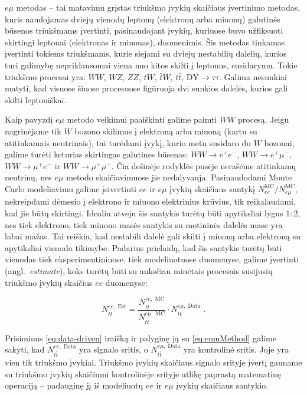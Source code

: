 \documentclass[a4paper, 12pt]{article}
\newcommand{\WW}{W\! W}
\newcommand{\ZZ}{Z\! Z}
\newcommand{\WZ}{W\! Z}
\newcommand{\tbarW}{\bar{t}W}
\newcommand{\ttbar}{t\bar{t}}
\newcommand{\emu}{e\mu}
\newcommand{\DYtau}{\mathrm{DY} \! \rightarrow \! \tau\tau}
\newlength\q
\begin{document}
$\emu$ metodas -- tai matavimu grįstas triukšmo įvykių skaičiaus įvertinimo metodas, kuris
naudojamas dviejų vienodų leptonų (elektronų arba miuonų) galutinės būsenos triukšmams
įvertinti, pasinaudojant įvykių, kuriuose buvo užfiksuoti skirtingi leptonai (elektronas
ir miuonas), duomenimis.
Šis metodas tinkamas įvertinti tokiems triukšmams, kurie siejami su dviejų nestabilių
dalelių, kurios turi galimybę nepriklausomai viena nuo kitos skilti į leptonus, susidarymu.
Tokie triukšmo procesai yra: $\WW$, $\WZ$, $\ZZ$, $tW$, $\tbarW$, $\ttbar$, $\DYtau$.
Galima nesunkiai matyti, kad visuose šiuose procesuose figūruoja dvi sunkios dalelės, kurios
gali skilti leptoniškai.

Kaip pavyzdį $\emu$ metodo veikimui paaiškinti galime paimti $WW$ procesą.
Jeigu nagrinėjame tik $W$ bozono skilimus į elektroną arba miuoną (kartu su atitinkamais
neutrinais), tai turėdami įvykį, kurio metu susidaro du $W$ bozonai, galime turėti
keturias skirtingas galutines būsenas: $WW \! \rightarrow \! e^+e^-$,
$WW \! \rightarrow \! e^+\mu^-$, $WW \! \rightarrow \! \mu^+e^-$ ir
$WW \! \rightarrow \! \mu^+\mu^-$.
Čia dešinėje rodyklės pusėje nerašėme atitinkamų neutrinų, nes $\emu$ metodo skaičiavimuose
jie nedalyvauja.
Pasinaudodami Monte Carlo modeliavimu galime įsivertinti $ee$ ir $\emu$ įvykių skaičiaus
santykį $N_{ee}^{\mathrm{MC}} / N_{\emu}^{\mathrm{MC}}$, nekreipdami dėmesio į elektrono
ir miuono elektrinius krūvius, tik reikalaudami, kad jie būtų skirtingi.
Idealiu atveju šis santykis turėtų būti apytiksliai lygus $1:2$, nes tiek elektrono, tiek
miuono masės santykis su motininės dalelės mase yra labai mažas.
Tai reiškia, kad nestabili dalelė gali skilti į miuoną arba elektroną su apytiksliai
vienoda tikimybe.
Padarius prielaidą, kad šis santykis turėtų būti vienodas tiek eksperimentiniuose, tiek
modeliuotuose duomenyse, galime įvertinti (angl.\ \textit{estimate}), koks turėtų būti su
anksčiau minėtais procesais susijusių triukšmo įvykių skaičius $ee$ duomenyse:

\begin{equation}
	N_{t\bar{t}}^{ee , \; \mathrm{Est}} =
	\frac{ N_{t\bar{t}}^{ee , \; \mathrm{MC}} }{ N_{t\bar{t}}^{e\mu , \; \mathrm{MC}} }
	\cdot N_{t\bar{t}}^{e\mu , \; \mathrm{Data}} \; .
	\label{eq:emuMethod}
\end{equation}

Prisiminus \eqref{eq:data-driven} iraišką ir palyginę ją su \eqref{eq:emuMethod} galime
sakyti, kad $N_{t\bar{t}}^{ee , \; \mathrm{Data}}$ yra signalo sritis, o
$N_{t\bar{t}}^{e\mu , \; \mathrm{Data}}$ yra kontrolinė sritis. Joje yra vien tik triukšmo
įvykiai.
Triukšmo įvykių skaičiaus signalo srityje įvertį gauname su triukšmo įvykių skaičiumi
kontrolinėje srityje atlikę paprastą matematinę operaciją -- padauginę jį iš modeliuotų
$ee$ ir $\emu$ įvykių skaičiaus santykio.
\end{document}
